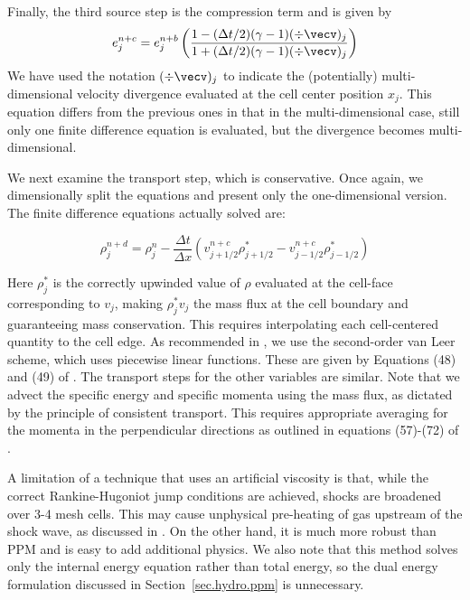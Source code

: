 Finally, the third source step is the compression term and is given by
\begin{equation}
e^{n+c}_j = e^{n+b}_j \left( \frac{1 - (\Delta t/2) (\gamma - 1) (\div \vecv)_j }
                           {1 + (\Delta t/2) (\gamma - 1) (\div \vecv)_j } \right)
\end{equation}
We have used the notation $(\div \vecv)_j$ to indicate the
(potentially) multi-dimensional velocity divergence evaluated at the
cell center position $x_j$.  This equation differs from the previous
ones in that in the multi-dimensional case, still only one finite
difference equation is evaluated, but the divergence becomes
multi-dimensional.

We next examine the transport step, which is conservative.  Once
again, we dimensionally split the equations and present only the
one-dimensional version.  The finite difference equations actually
solved are:

\begin{equation}
\rho_j^{n+d} = \rho_j^{n} - \frac{\Delta t}{\Delta x} (v^{n+c}_{j+1/2} \rho^{*}_{j+1/2} - v^{n+c}_{j-1/2} \rho^{*}_{j-1/2} )
\end{equation}

Here $\rho^*_j$ is the correctly upwinded value of $\rho$ evaluated at
the cell-face corresponding to $v_j$, making $\rho^*_j v_j$ the mass
flux at the cell boundary and guaranteeing mass conservation.   This
requires interpolating each cell-centered quantity to the cell edge.
As recommended in \citet{Stone92a}, we use the second-order van Leer
scheme, which uses piecewise linear functions.  These are given by
Equations (48) and (49) of \citet{Stone92a}.  The transport steps for
the other variables are similar.  Note that we advect the specific
energy and specific momenta using the mass flux, as dictated by the
principle of consistent transport.  This requires appropriate
averaging for the momenta in the perpendicular directions as outlined
in equations (57)-(72) of \citet{Stone92a}.

A limitation of a technique that uses an artificial viscosity is that,
while the correct Rankine-Hugoniot jump conditions are achieved,
shocks are broadened over 3-4 mesh cells. This may cause unphysical
pre-heating of gas upstream of the shock wave, as discussed in
\citet{1994ApJ...429..434A}.  On the other hand, it is much more
robust than PPM and is easy to add additional physics.  We also note
that this method solves only the internal energy equation rather than
total energy, so the dual energy formulation discussed in
Section~\ref{sec.hydro.ppm} is unnecessary.

